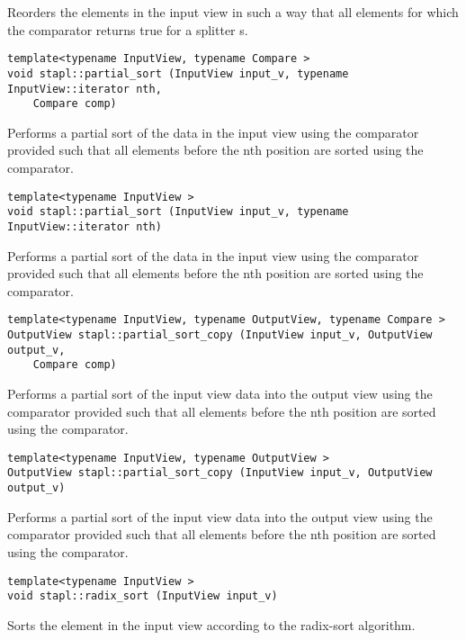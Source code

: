 Reorders the elements in the input view in such a way that all elements for which the comparator returns true for a splitter s.

\begin{verbatim}
template<typename InputView, typename Compare >
void stapl::partial_sort (InputView input_v, typename InputView::iterator nth,
    Compare comp)
\end{verbatim}

Performs a partial sort of the data in the input view using the comparator provided such that all elements before the nth position are sorted using the comparator.

\begin{verbatim}
template<typename InputView >
void stapl::partial_sort (InputView input_v, typename InputView::iterator nth)
\end{verbatim}

Performs a partial sort of the data in the input view using the comparator provided such that all elements before the nth position are sorted using the comparator.

\begin{verbatim}
template<typename InputView, typename OutputView, typename Compare >
OutputView stapl::partial_sort_copy (InputView input_v, OutputView output_v,
    Compare comp)
\end{verbatim}

Performs a partial sort of the input view data into the output view using the comparator provided such that all elements before the nth position are sorted using the comparator.

\begin{verbatim}
template<typename InputView, typename OutputView >
OutputView stapl::partial_sort_copy (InputView input_v, OutputView output_v)
\end{verbatim}

Performs a partial sort of the input view data into the output view using the comparator provided such that all elements before the nth position are sorted using the comparator.

\begin{verbatim}
template<typename InputView >
void stapl::radix_sort (InputView input_v)
\end{verbatim}

Sorts the element in the input view according to the radix-sort algorithm.


